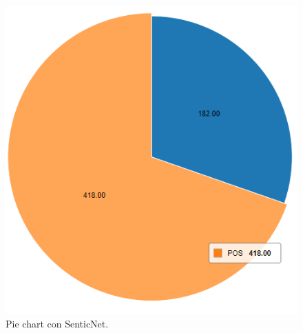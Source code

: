\begin{figure}[t]
    \center\includegraphics[width=.95\linewidth]{img/analysis/pie3.png}
    \caption{Pie chart con SenticNet.}
\end{figure}
